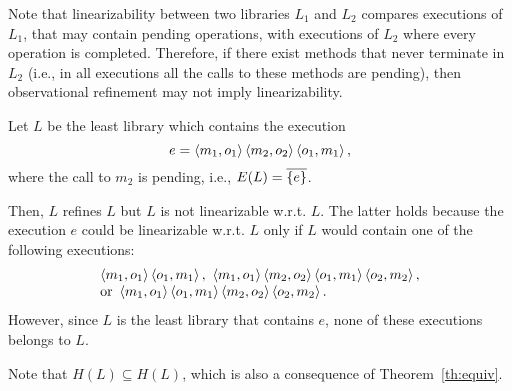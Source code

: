 Note that linearizability between two libraries $L_1$ and $L_2$ compares executions 
of $L_1$, that may contain pending operations, with executions of $L_2$ where every operation 
is completed. Therefore, if there exist methods that never terminate in $L_2$ (i.e., in all executions all the 
calls to these methods are pending), then 
observational refinement may not
imply linearizability. 

\begin{example}
Let $L$ be the least library which contains the execution 
\[
e=\left\langle {m_1,o_1} \right\rangle\left\langle {m_2,o_2} \right\rangle\left\langle {o_1,m_1} \right\rangle,
\] 
where the call to $m_2$ is pending, i.e., $E(L)=\overline{{\{e\}}}$.

Then, $L$ refines $L$
but $L$ is not linearizable w.r.t. $L$. The latter holds because the execution 
$e$ could be linearizable w.r.t. $L$ only if $L$ would contain one of the following
executions:
\[
\begin{array}{l}
\tup{m_1,o_1}\tup{o_1,m_1},\ \tup{m_1,o_1}\tup{m_2,o_2}\tup{o_1,m_1}\tup{o_2,m_2}, \\ %
\mbox{or }\tup{m_1,o_1}\tup{o_1,m_1}\tup{m_2,o_2}\tup{o_2,m_2}.
\end{array}
\]
However, since $L$ is the least library that contains $e$, none of these executions belongs to $L$.

Note that $H(L)\subseteq H(L)$, which is also a consequence of Theorem~\ref{th:equiv}.
\end{example}

%

